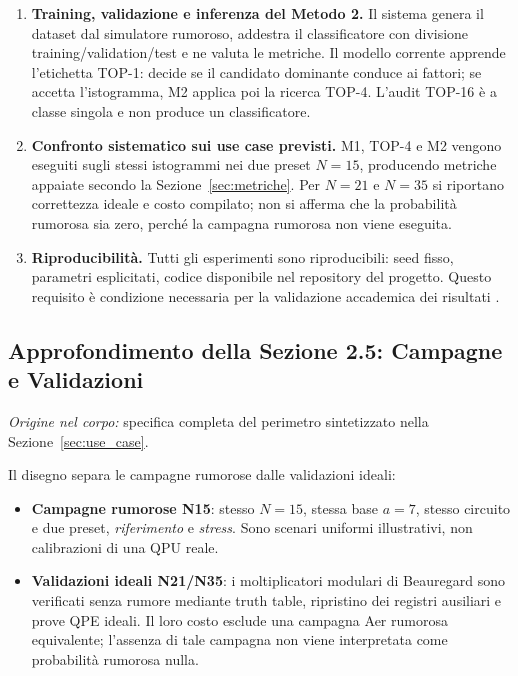 \begin{onehalfspace}
\begin{enumerate}
    \item \textbf{Training, validazione e inferenza del Metodo 2.}
    Il sistema genera il dataset dal simulatore rumoroso, addestra il classificatore con divisione training/validation/test e ne valuta le metriche. Il modello corrente apprende l'etichetta TOP-1: decide se il candidato dominante conduce ai fattori; se accetta l'istogramma, M2 applica poi la ricerca TOP-4. L'audit TOP-16 è a classe singola e non produce un classificatore.

    \item \textbf{Confronto sistematico sui use case previsti.}
    M1, TOP-4 e M2 vengono eseguiti sugli stessi istogrammi nei due preset $N=15$, producendo metriche appaiate secondo la Sezione~\ref{sec:metriche}. Per $N=21$ e $N=35$ si riportano correttezza ideale e costo compilato; non si afferma che la probabilità rumorosa sia zero, perché la campagna rumorosa non viene eseguita.

    \item \textbf{Riproducibilità.}
    Tutti gli esperimenti sono riproducibili: seed fisso, parametri esplicitati, codice disponibile nel repository del progetto. Questo requisito è condizione necessaria per la validazione accademica dei risultati \cite{shor_hpec2023}.

\end{enumerate}

\subsection{Approfondimento della Sezione 2.5: Campagne e Validazioni}
\label{app:obiettivi:usecase}

\noindent\textit{Origine nel corpo:} specifica completa del perimetro sintetizzato nella Sezione~\ref{sec:use_case}.

Il disegno separa le campagne rumorose dalle validazioni ideali:

\begin{itemize}
    \item \textbf{Campagne rumorose N15}: stesso $N=15$, stessa base $a=7$, stesso circuito e due preset, \emph{riferimento} e \emph{stress}. Sono scenari uniformi illustrativi, non calibrazioni di una \ac{QPU} reale.
    \item \textbf{Validazioni ideali N21/N35}: i moltiplicatori modulari di Beauregard sono verificati senza rumore mediante truth table, ripristino dei registri ausiliari e prove QPE ideali. Il loro costo esclude una campagna Aer rumorosa equivalente; l'assenza di tale campagna non viene interpretata come probabilità rumorosa nulla.
\end{itemize}


\end{onehalfspace}
